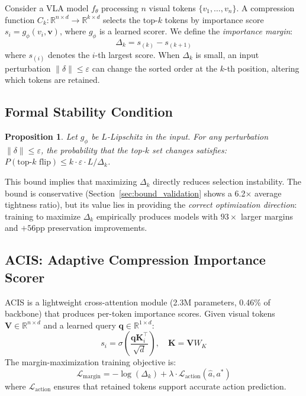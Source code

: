 \documentclass[conference]{corl_2026}
\newtheorem{proposition}{Proposition}
\newcommand{\acis}{ACIS}
\newcommand{\deltak}{\Delta_k}
\begin{document}
Consider a VLA model $f_\theta$ processing $n$ visual tokens $\{v_1, \ldots, v_n\}$. A compression function $C_k: \mathbb{R}^{n \times d} \rightarrow \mathbb{R}^{k \times d}$ selects the top-$k$ tokens by importance score $s_i = g_\phi(v_i, \mathbf{v})$, where $g_\phi$ is a learned scorer. We define the \emph{importance margin}:
\begin{equation}
\deltak = s_{(k)} - s_{(k+1)}
\end{equation}
where $s_{(i)}$ denotes the $i$-th largest score. When $\deltak$ is small, an input perturbation $\|\delta\| \leq \varepsilon$ can change the sorted order at the $k$-th position, altering which tokens are retained.

\subsection{Formal Stability Condition}
\label{sec:formal}

\begin{proposition}
Let $g_\phi$ be $L$-Lipschitz in the input. For any perturbation $\|\delta\| \leq \varepsilon$, the probability that the top-$k$ set changes satisfies:
$P(\text{top-}k\text{ flip}) \leq k \cdot \varepsilon \cdot L / \deltak$.
\end{proposition}

This bound implies that maximizing $\deltak$ directly reduces selection instability. The bound is conservative (Section~\ref{sec:bound_validation} shows a 6.2$\times$ average tightness ratio), but its value lies in providing the \emph{correct optimization direction}: training to maximize $\deltak$ empirically produces models with $93\times$ larger margins and $+56$pp preservation improvements.

\subsection{ACIS: Adaptive Compression Importance Scorer}

\acis{} is a lightweight cross-attention module (2.3M parameters, 0.46\% of backbone) that produces per-token importance scores. Given visual tokens $\mathbf{V} \in \mathbb{R}^{n \times d}$ and a learned query $\mathbf{q} \in \mathbb{R}^{1 \times d}$:
\begin{equation}
s_i = \sigma\left(\frac{\mathbf{q} \mathbf{K}_i^\top}{\sqrt{d}}\right), \quad \mathbf{K} = \mathbf{V} W_K
\end{equation}
The margin-maximization training objective is:
\begin{equation}
\mathcal{L}_{\text{margin}} = -\log(\deltak) + \lambda \cdot \mathcal{L}_{\text{action}}(\hat{a}, a^*)
\end{equation}
where $\mathcal{L}_{\text{action}}$ ensures that retained tokens support accurate action prediction.
\end{document}
